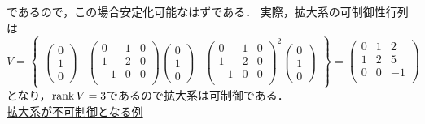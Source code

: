 であるので，この場合安定化可能なはずである．
実際，拡大系の可制御性行列は
\[
 V = 
 \left\{
 \begin{array}{ccc}
 \left(
 \begin{array}{c}
  0 \\
  1 \\
  0
 \end{array}
 \right) &
 \left(
 \begin{array}{ccc}
  0 & 1 & 0 \\
  1 & 2 & 0 \\
  -1 & 0 & 0 \\
 \end{array}
 \right)
 \left(
 \begin{array}{c}
  0 \\
  1 \\
  0
 \end{array}
 \right) &
 \left(
 \begin{array}{ccc}
  0 & 1 & 0 \\
  1 & 2 & 0 \\
  -1 & 0 & 0 \\
 \end{array}
 \right)^2
 \left(
 \begin{array}{c}
  0 \\
  1 \\
  0
 \end{array}
 \right)
 \end{array}
 \right\} =
 \left(
 \begin{array}{ccc}
  0 & 1 & 2 \\
  1 & 2 & 5 \\
  0 & 0 & -1 \\
 \end{array}
 \right)
\]
となり，$\mathop{\rm rank}\nolimits V = 3$であるので拡大系は可制御である．
\\


\noindent
\underline{ 拡大系が不可制御となる例}

